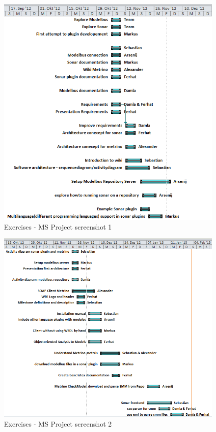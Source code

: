 \newpage

\begin{figure}[htb]
\begin{center}
\includegraphics[width=\textwidth]{msp_part1}
\caption{Exercises - MS Project screenshot 1}
\end{center}
\end{figure}

\newpage

\begin{figure}[htb]
\begin{center}
\includegraphics[width=\textwidth]{msp_part2}
\caption{Exercises - MS Project screenshot 2}
\end{center}
\end{figure}


